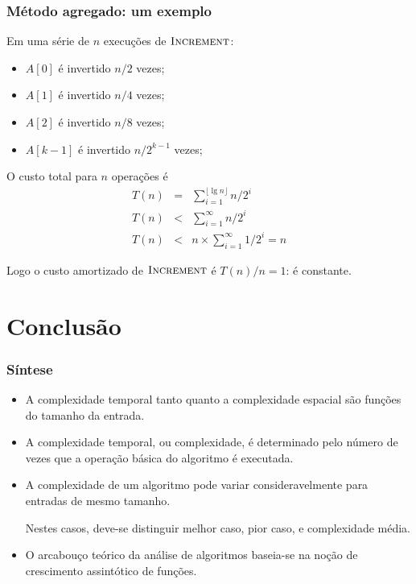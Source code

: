 \documentclass[handout]{beamer}
\begin{document}
\begin{frame}

\frametitle{Método agregado: um exemplo}

Em uma série de $n$ execuções de $\textnormal{\scshape Increment}$:
\begin{itemize}
\item $A[0]$ é invertido $n/2$ vezes;
\item $A[1]$ é invertido $n/4$ vezes;
\item $A[2]$ é invertido $n/8$ vezes;
\item $A[k-1]$ é invertido $n/2^{k-1}$ vezes;
\end{itemize}
O custo total para $n$ operações é 
\begin{eqnarray*}
T(n) & = & \sum_{i=1}^{\lfloor \lg n \rfloor} n/2^i \\
T(n) & < & \sum_{i=1}^{\infty} n/2^i \\
T(n) & < & n \times \sum_{i=1}^{\infty} 1/2^i = n
\end{eqnarray*}

Logo o custo amortizado de $\textnormal{\scshape Increment}$ é $T(n)/n = 1$: é \alert{constante}.

\end{frame}

\section{Conclusão}

\begin{frame}
\frametitle{Síntese}
\begin{itemize}
\item A complexidade temporal tanto quanto a complexidade espacial são
funções do tamanho da entrada.
\item A complexidade temporal, ou complexidade, é determinado pelo número
de vezes que a operação básica do algoritmo é executada.
\item A complexidade de um algoritmo pode variar consideravelmente para
entradas de mesmo tamanho. 

Nestes casos, deve-se distinguir melhor caso, pior caso, e complexidade média.
\item O arcabouço teórico da análise de algoritmos baseia-se na noção de
  crescimento assintótico de funções.
\end{itemize}
\end{frame}
\end{document}
